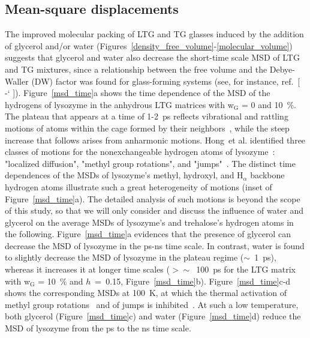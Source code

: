 \documentclass[journal=jpcbfk,manuscript=article]{achemso}
\newcommand*{\citen}[1]{%
\begingroup
\romannumeral-`\x %
\setcitestyle{numbers}%
\cite{#1}%
\endgroup   
}
\begin{document}
\begin{singlespacing}
\newpage

\subsection{Mean-square displacements}

The improved molecular packing of LTG and TG glasses induced by the addition of glycerol and/or water
(Figures~\ref{density_free_volume}-\ref{molecular_volume}) suggests that glycerol and water also
decrease the short-time scale MSD of LTG and TG mixtures, since a relationship between the free volume and the Debye-Waller (DW)
factor was found for glass-forming systems (see, for instance, ref.~[\citen{Starr2002,Ottochian2011}]).
Figure~\ref{msd_time}a shows the time dependence of the MSD of the hydrogens of lysozyme in the anhydrous LTG matrices with 
w$_{\textrm{G}}$ = 0 and 10~\%. The plateau that appears at a time of 1-2~ps reflects vibrational and rattling motions of atoms within the 
cage formed by their neighbors~\cite{Hong2011}, while the steep increase that follows arises from anharmonic motions. 
Hong~et al. identified three classes of motions for the nonexchangeable hydrogen atoms of lysozyme~: "localized diffusion", 
"methyl group rotations", and "jumps"~\cite{Hong2011}. 
The distinct time dependences of the MSDs of lysozyme's methyl, hydroxyl, and H$_{\alpha}$ backbone hydrogen atoms illustrate
such a great heterogeneity of motions (inset of Figure~\ref{msd_time}a). The detailed analysis of such motions is beyond the scope 
of this study, so that we will only consider and discuss the influence of water and glycerol on the average MSDs of lysozyme's 
and trehalose's hydrogen atoms in the following.
Figure~\ref{msd_time}a evidences that the presence of glycerol can decrease the MSD of lysozyme in the ps-ns time scale.
In contrast, water is found to slightly decrease the MSD of lysozyme in the plateau regime ($\sim$~1~ps), whereas it 
increases it at longer time scales ($> \sim$~100~ps for the LTG matrix with w$_{\textrm{G}}$ = 10~\%
and $h$~=~0.15, Figure~\ref{msd_time}b). Figure~\ref{msd_time}c-d shows the corresponding MSDs at 100~K, at which 
the thermal activation of methyl group rotations~\cite{Roh2005,Hong2013} and of jumps is inhibited~\cite{Hong2013}.
At such a low temperature, both glycerol (Figure~\ref{msd_time}c) and water (Figure~\ref{msd_time}d) reduce the MSD of lysozyme 
from the ps to the ns time scale.


\end{singlespacing}
\end{document}
